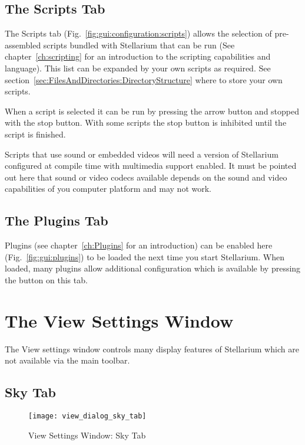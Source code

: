 \subsection{The Scripts Tab}
\label{sec:gui:scripts}


The Scripts tab (Fig.~\ref{fig:gui:configuration:scripts}) allows the
selection of pre-assembled scripts bundled with Stellarium that can be
run (See chapter~\ref{ch:scripting} for an introduction to the
scripting capabilities and language). This list can be expanded by
your own scripts as required. See
section~\ref{sec:FilesAndDirectories:DirectoryStructure} where to
store your own scripts.

When a script is selected it can be run by pressing the arrow button
and stopped with the stop button. With some scripts the stop button is
inhibited until the script is finished. %

Scripts that use sound or embedded videos will need a version of
Stellarium configured at compile time with multimedia support
enabled. It must be pointed out here that sound or video codecs
available depends on the sound and video capabilities of you computer
platform and may not work.


\subsection{The Plugins Tab}
\label{sec:gui:configuration:plugins}


Plugins (see chapter~\ref{ch:Plugins} for an introduction) can be
enabled here (Fig.~\ref{fig:gui:plugins}) to be loaded the next time
you start Stellarium. When loaded, many plugins allow additional configuration
which is available by pressing the  button on this tab.




\section{The View Settings Window}
\label{sec:gui:view}

The View settings window controls many display features of Stellarium
which are not available via the main toolbar.

\subsection{Sky Tab}
\label{sec:gui:view:sky}

\begin{figure}[t]
\centering\texttt{[image: view\_dialog\_sky\_tab]}
\caption{View Settings Window: Sky Tab}
\label{fig:gui:view:sky}
\end{figure}

